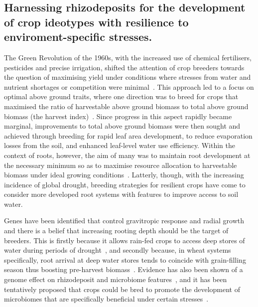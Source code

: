 \documentclass[11pt,a4paper]{article}
\numberwithin{equation}{section}
\begin{document}
\subsection{Harnessing rhizodeposits for the development of crop ideotypes with resilience to enviroment-specific stresses.}
The Green Revolution of the 1960s, with the increased use of chemical fertilisers, pesticides and precise irrigation, shifted the attention of crop breeders towards the question of maximising yield under conditions where stresses from water and nutrient shortages or competition were minimal~\citep{preece2020return}. This approach led to a focus on optimal above ground traits, where one direction was to breed for crops that maximised the ratio of harvestable above ground biomass to total above ground biomass (the harvest index)~\citep{richards1993improving}. Since progress in this aspect rapidly became marginal, improvements to total above ground biomass were then sought and achieved through breeding for rapid leaf area development, to reduce evaporation losses from the soil, and enhanced leaf-level water use efficiency. Within the context of roots, however, the aim of many was to maintain root development at the necessary minimum so as to maximise resource allocation to harvestable biomass under ideal growing conditions~\citep{condon2004breeding}. Latterly, though, with the increasing incidence of global drought, breeding strategies for resilient crops have come to consider more developed root systems with features to improve access to soil water. 

Genes have been identified that control gravitropic response and radial growth~\citep{hafeez2024breeding} and there is a belief that increasing rooting depth should be the target of breeders. This is firstly because it allows rain-fed crops to access deep stores of water during periods of drought~\citep{lynch2013steep, uga2013control}, and secondly because, in wheat systems specifically, root arrival at deep water stores tends to coincide with grain-filling season thus boosting pre-harvest biomass~\citep{palta2011large, wasson2012traits, ober2021wheat}. Evidence has also been shown of a genome effect on rhizodeposit and microbiome features~\citep{iannucci2021relationships}, and it has been tentatively proposed that crops could be bred to promote the development of microbiomes that are specifically beneficial under certain stresses~\cite{ober2021wheat}. 
\end{document}
